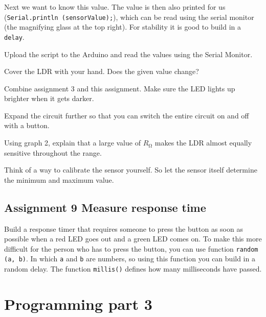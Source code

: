 \documentclass{arduino}
\begin{document}
Next we want to know this value. The value is then also printed for us (\lstinline{Serial.println (sensorValue);}), which can be read using the serial monitor (the magnifying glass at the top right). For stability it is good to build in a \lstinline{delay}.

\begin{alphalist}
\item Upload the script to the Arduino and read the values ​​using the Serial Monitor.

\item Cover the LDR with your hand. Does the given value change?

\item Combine assignment 3 and this assignment. Make sure the LED lights up brighter when it gets darker.

\item Expand the circuit further so that you can switch the entire circuit on and off with a button.

\item Using graph 2, explain that a large value of $ R_{\si{\ohm}} $ makes the LDR almost equally sensitive throughout the range.

\item Think of a way to calibrate the sensor yourself. So let the sensor itself determine the minimum and maximum value.
\end{alphalist}


\subsection{Assignment 9 Measure response time}

Build a response timer that requires someone to press the button as soon as possible when a red LED goes out and a green LED comes on. To make this more difficult for the person who has to press the button, you can use function \lstinline{random (a, b)}. In which \lstinline{a} and \lstinline{b} are numbers, so using this function you can build in a random delay. The function \lstinline{millis()} defines how many milliseconds have passed.

\newpage

\section{Programming part 3}

\end{document}
